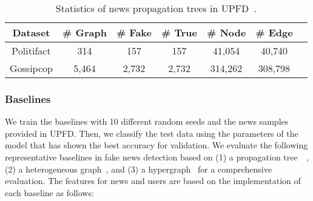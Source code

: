 \documentclass[conference]{IEEEtran}
\begin{document}
\begin{table}
\centering
\caption{Statistics of news propagation trees in UPFD~\cite{dou2021user}.}
\label{graph_statistics}
\begin{tabular}{ccccccc}
\hline
\textbf{Dataset} & \textbf{\# Graph} & \textbf{\# Fake}& \textbf{\# True}   & \textbf{\# Node } & \textbf{\# Edge} \\
\hline
\hline
Politifact & 314 & 157& 157 & 41,054 & 40,740\\
Gossipcop & 5,464 & 2,732& 2,732 & 314,262 & 308,798 \\
\hline
\end{tabular}
\end{table}



\subsubsection{Baselines}
We train the baselines with 10 different random seeds and the news samples provided in UPFD. Then, we classify the test data using the parameters of the model that has shown the best accuracy for validation. We evaluate the following representative baselines in fake news detection based on  (1) a propagation tree~\cite{bian2020rumor, monti2019fake}~\cite{han2020graph, dou2021user, shi2020masked, song2021temporally},   (2) a heterogeneous graph~\cite{ren2021fake}, and (3) a hypergraph~\cite{feng2019hypergraph} for a comprehensive evaluation. The features for news and users are based on the implementation of each baseline as follows:
\end{document}
